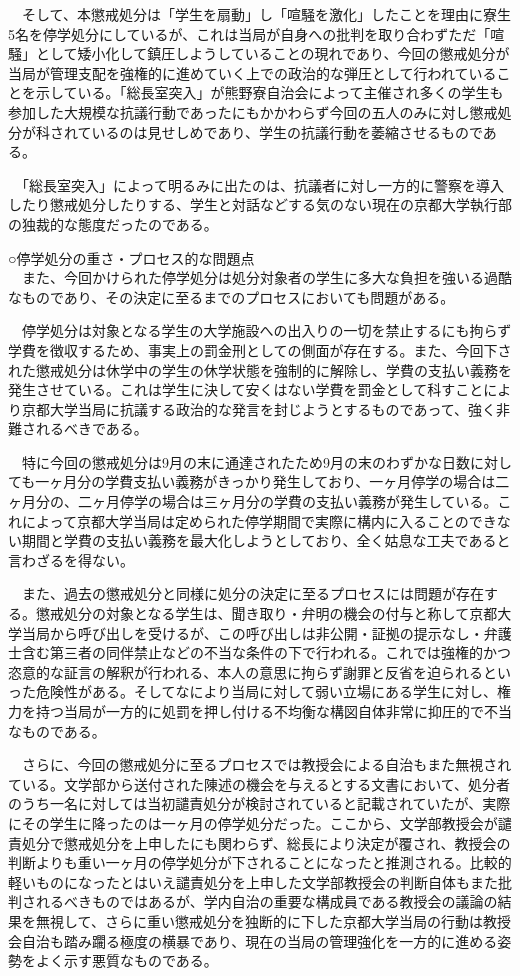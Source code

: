 {\begin{tcolorbox}[colback=white, colbacktitle=gray!30!white, coltitle=black, title=2024年9月25日付で京大生5名に下された懲戒処分に対する抗議声明,breakable]
　そして、本懲戒処分は「学生を扇動」し「喧騒を激化」したことを理由に寮生5名を停学処分にしているが、これは当局が自身への批判を取り合わずただ「喧騒」として矮小化して鎮圧しようしていることの現れであり、今回の懲戒処分が当局が管理支配を強権的に進めていく上での政治的な弾圧として行われていることを示している。「総長室突入」が熊野寮自治会によって主催され多くの学生も参加した大規模な抗議行動であったにもかかわらず今回の五人のみに対し懲戒処分が科されているのは見せしめであり、学生の抗議行動を萎縮させるものである。

　「総長室突入」によって明るみに出たのは、抗議者に対し一方的に警察を導入したり懲戒処分したりする、学生と対話などする気のない現在の京都大学執行部の独裁的な態度だったのである。

\noindent ○停学処分の重さ・プロセス的な問題点\\
　また、今回かけられた停学処分は処分対象者の学生に多大な負担を強いる過酷なものであり、その決定に至るまでのプロセスにおいても問題がある。

　停学処分は対象となる学生の大学施設への出入りの一切を禁止するにも拘らず学費を徴収するため、事実上の罰金刑としての側面が存在する。また、今回下された懲戒処分は休学中の学生の休学状態を強制的に解除し、学費の支払い義務を発生させている。これは学生に決して安くはない学費を罰金として科すことにより京都大学当局に抗議する政治的な発言を封じようとするものであって、強く非難されるべきである。

　特に今回の懲戒処分は9月の末に通達されたため9月の末のわずかな日数に対しても一ヶ月分の学費支払い義務がきっかり発生しており、一ヶ月停学の場合は二ヶ月分の、二ヶ月停学の場合は三ヶ月分の学費の支払い義務が発生している。これによって京都大学当局は定められた停学期間で実際に構内に入ることのできない期間と学費の支払い義務を最大化しようとしており、全く姑息な工夫であると言わざるを得ない。

　また、過去の懲戒処分と同様に処分の決定に至るプロセスには問題が存在する。懲戒処分の対象となる学生は、聞き取り・弁明の機会の付与と称して京都大学当局から呼び出しを受けるが、この呼び出しは非公開・証拠の提示なし・弁護士含む第三者の同伴禁止などの不当な条件の下で行われる。これでは強権的かつ恣意的な証言の解釈が行われる、本人の意思に拘らず謝罪と反省を迫られるといった危険性がある。そしてなにより当局に対して弱い立場にある学生に対し、権力を持つ当局が一方的に処罰を押し付ける不均衡な構図自体非常に抑圧的で不当なものである。

　さらに、今回の懲戒処分に至るプロセスでは教授会による自治もまた無視されている。文学部から送付された陳述の機会を与えるとする文書において、処分者のうち一名に対しては当初譴責処分が検討されていると記載されていたが、実際にその学生に降ったのは一ヶ月の停学処分だった。ここから、文学部教授会が譴責処分で懲戒処分を上申したにも関わらず、総長により決定が覆され、教授会の判断よりも重い一ヶ月の停学処分が下されることになったと推測される。比較的軽いものになったとはいえ譴責処分を上申した文学部教授会の判断自体もまた批判されるべきものではあるが、学内自治の重要な構成員である教授会の議論の結果を無視して、さらに重い懲戒処分を独断的に下した京都大学当局の行動は教授会自治も踏み躙る極度の横暴であり、現在の当局の管理強化を一方的に進める姿勢をよく示す悪質なものである。


\end{tcolorbox}}
